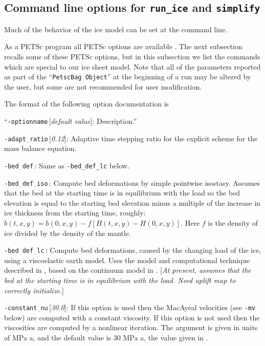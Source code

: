\documentclass[11pt,final]{amsart}
\renewcommand{\t}[1]{\texttt{#1}}
\begin{document}
\newcommand{\opt}[1]{\vspace{1mm}\noindent \large\texttt{-#1}\,:\quad\normalsize}
\newcommand{\optdef}[2]{\vspace{1mm}\noindent \large\texttt{-#1}\,[\textsl{#2}]:\quad\normalsize}
\newcommand{\und}{$\underline{\,\,\,}$}

\subsection{Command line options for \t{run\_ice} and \t{simplify}}  Much of the behavior of the ice model can be set at the command line.

As a PETSc program all PETSc options are available \cite{petsc-web-page,petsc-user-ref}.  The next subsection recalls some of these PETSc options, but in this subsection we list the commands which are special to our ice sheet model.  Note that all of the parameters reported as part of the ``\verb|PetscBag Object|'' at the beginning of a run may be altered by the user, but some are not recommended for user modification.

The format of the following option documentation is

\centerline{``\optdef{optionname}{default value} Description.''}
\bigskip

\optdef{adapt\und ratio}{0.12}  Adaptive time stepping ratio for the explicit scheme for the mass balance equation.

\opt{bed\und def} Same as \verb|-bed_def_lc| below.

\opt{bed\und def\und iso} Compute bed deformations by simple pointwise isostasy.  Assumes that the bed at the starting time is in equilibrium with the load so the bed elevation is equal to the starting bed elevation minus a multiple of the increase in ice thickness from the starting time, roughly: $b(t,x,y) = b(0,x,y) - f [H(t,x,y) - H(0,x,y)]$.  Here $f$ is the density of ice divided by the density of the mantle.

\opt{bed\und def\und lc} Compute bed deformations, caused by the changing load of the ice, using a viscoelastic earth model.  Uses the model and computational technique described in \cite{BLKfastearth}, based on the continuum model in \cite{LingleClark}.  [\emph{At present, assumes that the bed at the starting time is in equilibrium with the load.  Need uplift map to correctly initialize.}]

\optdef{constant\und nu}{30.0}  If this option is used then the MacAyeal velocities (see \verb|-mv| below) are computed with a constant viscosity.  If this option is not used then the viscosities are computed by a nonlinear iteration.  The argument is given in units of MPa a, and the default value is $30$ MPa a, the value given in \cite{Ritzetal2001}.
\end{document}
